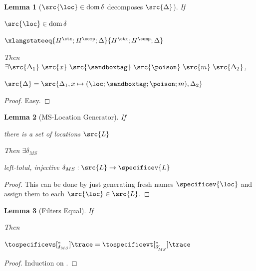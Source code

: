 \documentclass[a4paper,names,dvipsnames]{article}
\newtheorem{lemma}{Lemma}
\begin{document}
\begin{lemma}[$\src{\loc}\in\operatorname{dom}\delta$ decomposes $\src{\Delta}$]\label{lem:deltadecomposeDelta}
  If
  \begin{assumptions}
    \item $\src{\loc}\in\operatorname{dom}\delta$
    \item $\xlangstateeq{H^{\ctx};H^{\comp};\Delta}{H^{\ctx};H^{\comp};\Delta}$
  \end{assumptions}
  Then $\exists \src{\Delta_{1}}\ \src{x}\ \src{\sandboxtag}\ \src{\poison}\ \src{m}\ \src{\Delta_{2}}$,
  \begin{goals}
    \item $\src{\Delta}=\src{\Delta_{1},x\mapsto(\loc;\sandboxtag;\poison;m),\Delta_{2}}$
  \end{goals}
\end{lemma}
\begin{proof}
  Easy.
\end{proof}

\begin{lemma}[MS-Location Generator]\label{lem:mslocgen}
  If
  \begin{assumptions}
    \item there is a set of locations $\src{L}$
  \end{assumptions}
  Then $\exists \delta_{MS}$
  \begin{goals}
    \item left-total, injective $\delta_{MS} : \src{L}\to\specificev{L}$
  \end{goals}
\end{lemma}
\begin{proof}
  This can be done by just generating fresh names $\specificev{\loc}$ and assign them to each $\src{\loc}\in\src{L}$.
\end{proof}

\begin{lemma}[Filters Equal]\label{lem:msfiltereq}
  If
  Then
  \begin{goals}
    \item $\tospecificevs[^{*}_{\delta_{MS}}]{\trace}=\tospecificevt[^{*}_{\delta_{MS}'}]{\trace}$
  \end{goals}
\end{lemma}
\begin{proof}
  Induction on .
\end{proof}
\end{document}
